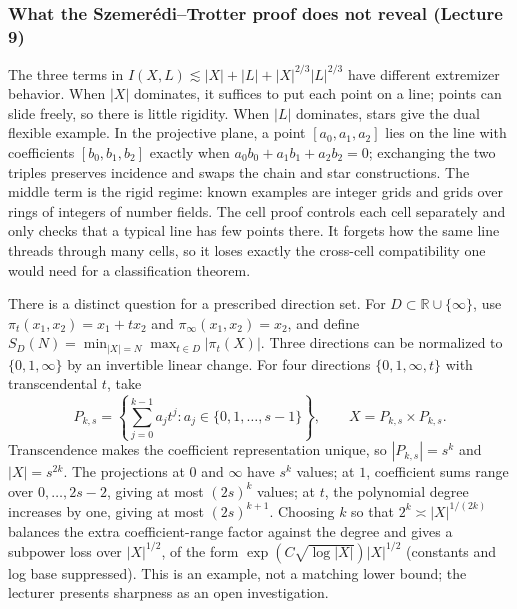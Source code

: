 \subsubsection{What the Szemerédi--Trotter proof does not reveal (Lecture 9)}\label{04-visual-computing-ii-ch033-what-the-szemeruxe9ditrotter-proof-does-not-reveal-lecture-9}

\hypertarget{04-visual-computing-ii-ch033-what-the-szemeréditrotter-proof-does-not-reveal-lecture-9}{}

The three terms in \(I(X,L)\lesssim |X|+|L|+|X|^{2/3}|L|^{2/3}\) have different extremizer behavior. When \(|X|\) dominates, it suffices to put each point on a line; points can slide freely, so there is little rigidity. When \(|L|\) dominates, stars give the dual flexible example. In the projective plane, a point \([a_0,a_1,a_2]\) lies on the line with coefficients \([b_0,b_1,b_2]\) exactly when \(a_0b_0+a_1b_1+a_2b_2=0\); exchanging the two triples preserves incidence and swaps the chain and star constructions. The middle term is the rigid regime: known examples are integer grids and grids over rings of integers of number fields. The cell proof controls each cell separately and only checks that a typical line has few points there. It forgets how the same line threads through many cells, so it loses exactly the cross-cell compatibility one would need for a classification theorem.

There is a distinct question for a prescribed direction set. For \(D\subset\mathbb R\cup\{\infty\}\), use \(\pi_t(x_1,x_2)=x_1+tx_2\) and \(\pi_\infty(x_1,x_2)=x_2\), and define \(S_D(N)=\min_{|X|=N}\max_{t\in D}|\pi_t(X)|\). Three directions can be normalized to \(\{0,1,\infty\}\) by an invertible linear change. For four directions \(\{0,1,\infty,t\}\) with transcendental \(t\), take \[
P_{k,s}=\left\{\sum_{j=0}^{k-1}a_jt^j: a_j\in\{0,1,\ldots,s-1\}\right\},\qquad X=P_{k,s}\times P_{k,s}.
\] Transcendence makes the coefficient representation unique, so \(|P_{k,s}|=s^k\) and \(|X|=s^{2k}\). The projections at \(0\) and \(\infty\) have \(s^k\) values; at \(1\), coefficient sums range over \(0,\ldots,2s-2\), giving at most \((2s)^k\) values; at \(t\), the polynomial degree increases by one, giving at most \((2s)^{k+1}\). Choosing \(k\) so that \(2^k\asymp |X|^{1/(2k)}\) balances the extra coefficient-range factor against the degree and gives a subpower loss over \(|X|^{1/2}\), of the form \(\exp(C\sqrt{\log |X|})|X|^{1/2}\) (constants and log base suppressed). This is an example, not a matching lower bound; the lecturer presents sharpness as an open investigation.

